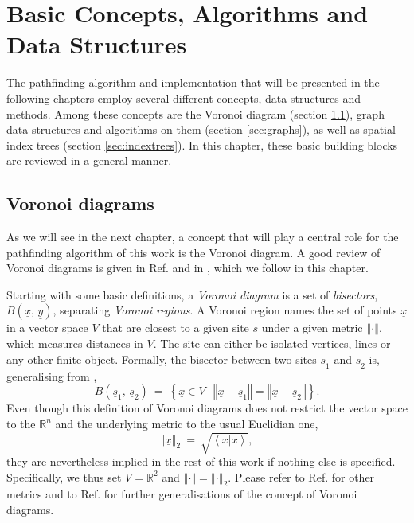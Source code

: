 %
%

\chapter{Basic Concepts, Algorithms and Data Structures}
\label{ch:algos}
The  pathfinding algorithm and implementation that will be presented in the following chapters
employ several different concepts, data structures and methods.
Among these concepts are the Voronoi diagram (section \ref{sec:voro}),
graph data structures and algorithms on them (section \ref{sec:graphs}),
as well as spatial index trees (section \ref{sec:indextrees}).
In this chapter, these basic building blocks are reviewed in a general manner.



\section{Voronoi diagrams}
\label{sec:voro}
As we will see in the next chapter, a concept that will play a central role for the pathfinding
algorithm of this work is the Voronoi diagram.
A good review of Voronoi diagrams is given in Ref. \cite[Ch. 7, pp. 147-171]{Berg2008} 
and in \cite[Ch. 5, pp. 209f]{FUH_geo2020}, which we follow in this chapter.

Starting with some basic definitions, a \textit{Voronoi diagram} is a set of 
\textit{bisectors}, $B\left(\underline{x},\, \underline{y}\right)$, separating \textit{Voronoi regions}.
A Voronoi region names the set of points $\underline{x}$ in a vector space $V$ that are closest to 
a given site $\underline{s}$ under a given metric $\left\Vert \cdot \right\Vert$, which measures distances in $V$.
The site can either be isolated vertices, lines or any other finite object.
Formally, the bisector between two sites $\underline{s}_1$ and $\underline{s}_2$ is, 
generalising from \cite[p. 140]{Icking2001},
\begin{equation}
	B\left(\underline{s}_1,\, \underline{s}_2\right)\ =\ \left\{ \underline{x} \in V \ |\ 
		\left\Vert \underline{x} - \underline{s}_1 \right\Vert = \left\Vert \underline{x} - \underline{s}_2 \right\Vert \right\}.
	\label{eq:bisector}
\end{equation}
Even though this definition of Voronoi diagrams does not restrict the vector space to the $\mathbb{R}^n$ 
and the underlying metric to the usual Euclidian one, 
\begin{equation}
	\left\Vert \underline{x} \right\Vert_2 \ =\ \sqrt{\left<x | x \right>},
\end{equation}
they are nevertheless implied in the rest of this work if nothing else is specified.
Specifically, we thus set $V = \mathbb{R}^2$ and $\left\Vert \cdot \right\Vert = \left\Vert \cdot \right\Vert_2$. 
Please refer to Ref. \cite{Icking2001} for other metrics and to Ref. \cite{Boissonnat2006} for further 
generalisations of the concept of Voronoi diagrams.




